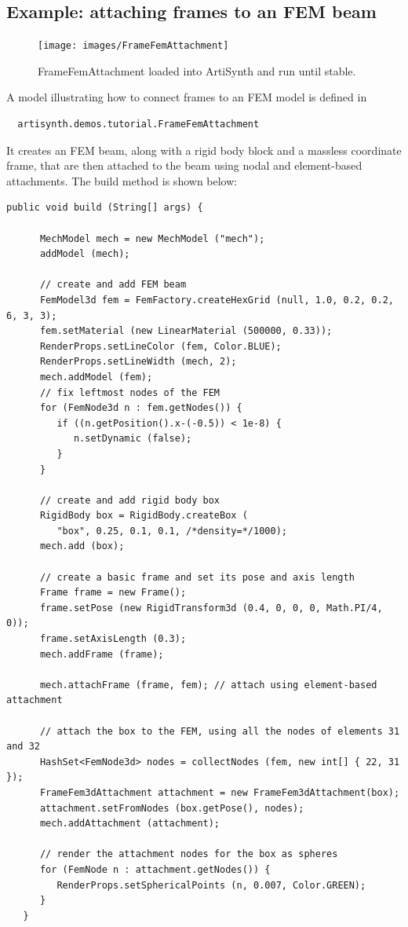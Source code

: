 \subsection{Example: attaching frames to an FEM beam}

\begin{figure}[ht]
	\centering
	\texttt{[image: images/FrameFemAttachment]}
	\caption{FrameFemAttachment loaded into ArtiSynth and run until stable.}
	\label{fig:fem:frameFemAttachment}
\end{figure}

A model illustrating how to connect frames to an FEM model 
is defined in
%
\begin{verbatim}
  artisynth.demos.tutorial.FrameFemAttachment
\end{verbatim}
%
It creates an FEM beam, along with a rigid body block and a 
massless coordinate frame, that are then attached to the beam
using nodal and element-based attachments. The build method is shown below:
\lstset{numbers=left}
\begin{lstlisting}[]
   public void build (String[] args) {

      MechModel mech = new MechModel ("mech");
      addModel (mech);

      // create and add FEM beam 
      FemModel3d fem = FemFactory.createHexGrid (null, 1.0, 0.2, 0.2, 6, 3, 3);
      fem.setMaterial (new LinearMaterial (500000, 0.33));
      RenderProps.setLineColor (fem, Color.BLUE);
      RenderProps.setLineWidth (mech, 2);
      mech.addModel (fem);
      // fix leftmost nodes of the FEM
      for (FemNode3d n : fem.getNodes()) {
         if ((n.getPosition().x-(-0.5)) < 1e-8) {
            n.setDynamic (false);
         }
      }

      // create and add rigid body box
      RigidBody box = RigidBody.createBox (
         "box", 0.25, 0.1, 0.1, /*density=*/1000);
      mech.add (box);

      // create a basic frame and set its pose and axis length
      Frame frame = new Frame();
      frame.setPose (new RigidTransform3d (0.4, 0, 0, 0, Math.PI/4, 0));
      frame.setAxisLength (0.3);
      mech.addFrame (frame);

      mech.attachFrame (frame, fem); // attach using element-based attachment

      // attach the box to the FEM, using all the nodes of elements 31 and 32
      HashSet<FemNode3d> nodes = collectNodes (fem, new int[] { 22, 31 });
      FrameFem3dAttachment attachment = new FrameFem3dAttachment(box);
      attachment.setFromNodes (box.getPose(), nodes);
      mech.addAttachment (attachment);

      // render the attachment nodes for the box as spheres
      for (FemNode n : attachment.getNodes()) {
         RenderProps.setSphericalPoints (n, 0.007, Color.GREEN);
      }
   }
\end{lstlisting}
